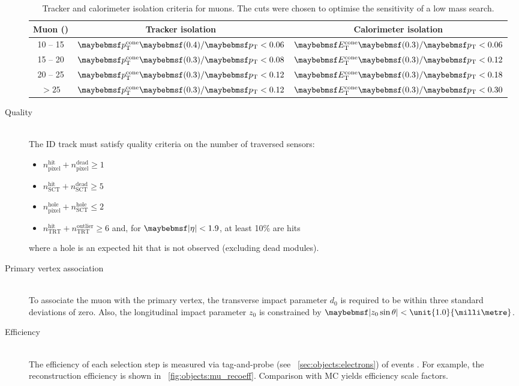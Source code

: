 \begin{description}
	\begin{table}[t]
		\begin{tabular}{c@{\hskip 0.3in}c@{\hskip 0.3in}c}
			\toprule
			Muon \pt (\GeV) & Tracker isolation & Calorimeter isolation \\
			\midrule
			10 -- 15 & $\ptcone{0.4}/\pt < 0.06$ & $\etcone{0.3}/\pt < 0.06$ \\
			15 -- 20 & $\ptcone{0.3}/\pt < 0.08$ & $\etcone{0.3}/\pt < 0.12$ \\
			20 -- 25 & $\ptcone{0.3}/\pt < 0.12$ & $\etcone{0.3}/\pt < 0.18$ \\
			$> 25$   & $\ptcone{0.3}/\pt < 0.12$ & $\etcone{0.3}/\pt < 0.30$ \\
			\bottomrule
		\end{tabular}
		\caption{Tracker and calorimeter isolation criteria for muons. The cuts were 
		chosen to optimise the sensitivity of a low mass \HWWlvlv search.}
		\label{tab:objects:mu_iso}
	\end{table}

\item[Quality] \hfill \\
	The ID track must satisfy quality criteria on the number of traversed sensors:
	\begin{itemize}[noitemsep,nolistsep]
		\item $n_{\text{pixel}}^{\text{hit}} + n_{\text{pixel}}^{\text{dead}} \geq 1$
		\item $n_{\text{SCT}}^{\text{hit}} + n_{\text{SCT}}^{\text{dead}} \geq 5$
		\item $n_{\text{pixel}}^{\text{hole}} + n_{\text{SCT}}^{\text{hole}} \leq 2$
		\item $n_{\text{TRT}}^{\text{hit}} + n_{\text{TRT}}^{\text{outlier}} \geq 6$ and, 
		for $\mods{\eta} < 1.9$, at least 10\% are hits
	\end{itemize}
	where a hole is an expected hit that is not observed (excluding dead modules).

\item[Primary vertex association] \hfill \\
	To associate the muon with the primary vertex, the transverse impact parameter $d_0$ 
	is required to be within three standard deviations of zero. Also, the longitudinal 
	impact parameter $z_0$ is constrained by $\mods{z_0 \sin\theta} < 
	\unit{1.0}{\milli\metre}$.

\item[Efficiency] \hfill \\
	The efficiency of each selection step is measured via tag-and-probe (see 
	\Section~\ref{sec:objects:electrons}) of 
	\HepProcess{\PZ \HepTo \Pmu\Pmu} events \cite{Muons:2012}. For example, the 
	reconstruction efficiency is shown in \Figure~\ref{fig:objects:mu_recoeff}. 
	Comparison with MC yields efficiency scale factors.


\end{description}
